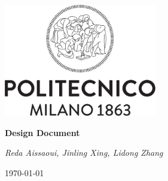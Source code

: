 \begin{titlepage}
\centering
\includegraphics[width=0.50\textwidth]{RASD/resources/logo_polimi.png}\par
\vspace{1.5cm}
{\LARGE \textbf{Design Document} \par}
\vspace{0.2cm}
{\large {}\par}
\vspace{1.0cm}
{\large\itshape Reda Aissaoui,  Jinling Xing,  Lidong Zhang\par}
\vspace{2cm}
\vfill
{\large \today \par}
\end{titlepage}
